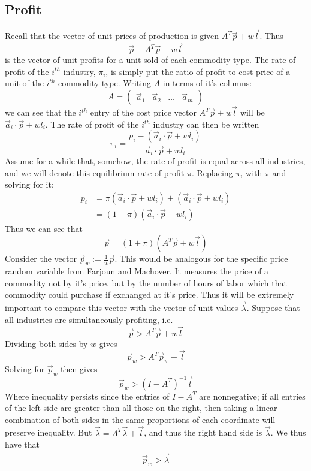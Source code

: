 \documentclass{article}
\theoremstyle{definition}
\theoremstyle{plain}
\theoremstyle{theorem}
\begin{document}
\subsection{Profit}
Recall that the vector of unit prices of production is given $A^T\vec{p} + w\vec{l}$. Thus 
\[ \vec{p} - A^T\vec{p} - w\vec{l} \]
is the vector of unit profits for a unit sold of each commodity type. The rate of profit of the $i^{th}$ industry, $\pi_i$, is simply put the ratio of profit to cost price of a unit of the $i^{th}$ commodity type. Writing $A$ in terms of it's columns:
\[ A= \begin{pmatrix} \vec{a}_1 & \vec{a}_2 & \ldots & \vec{a}_m \end{pmatrix} \]
we can see that the $i^{th}$ entry of the cost price vector $A^T\vec{p}+w\vec{l}$ will be $\vec{a}_i \cdot \vec{p} + wl_i$. The rate of profit of the $i^{th}$ industry can then be written
\[ \pi_i = \frac{p_i - (\vec{a}_i \cdot \vec{p} + wl_i)}{\vec{a}_i \cdot \vec{p} + wl_i} \]
Assume for a while that, somehow, the rate of profit is equal across all industries, and we will denote this equilibrium rate of profit $\pi$. Replacing $\pi_i$ with $\pi$ and solving for it:
\begin{align*}
	  p_i &= \pi(\vec{a}_i \cdot \vec{p} + wl_i) + (\vec{a}_i \cdot \vec{p} + wl_i) \\
	 &= (1+\pi)(\vec{a}_i\cdot \vec{p} + wl_i)
\end{align*}
Thus we can see that
\[ \vec{p} = (1+\pi)(A^T\vec{p}+w\vec{l}) \]
Consider the vector $\vec{p}_w := \frac{1}{w}\vec{p}$. This would be analogous for the specific price random variable from Farjoun and Machover. It measures the price of a commodity not by it's price, but by the number of hours of labor which that commodity could purchase if exchanged at it's price. Thus it will be extremely important to compare this vector with the vector of unit values $\vec{\lambda}$. Suppose that all industries are simultaneously profiting, i.e. 
\[ \vec{p} > A^T\vec{p} + w\vec{l} \]
Dividing both sides by $w$ gives
\[ \vec{p}_w > A^T\vec{p}_w + \vec{l} \]
Solving for $\vec{p}_w$ then gives
\[ \vec{p}_w > (I-A^T)^{-1}\vec{l} \]
Where inequality persists since the entries of $I-A^T$ are nonnegative; if all entries of the left side are greater than all those on the right, then taking a linear combination of both sides in the same proportions of each coordinate will preserve inequality. But $\vec{\lambda} = A^T\vec{\lambda} + \vec{l}$, and thus the right hand side is $\vec{\lambda}$. We thus have that
\begin{align}
	\vec{p}_w > \vec{\lambda} \label{priceExceedsValue}
\end{align}
\end{document}
